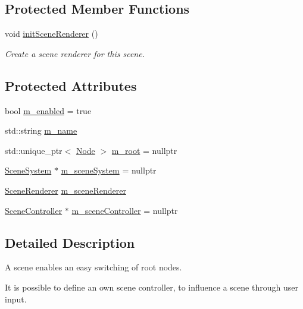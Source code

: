 \subsection*{Protected Member Functions}
\begin{DoxyCompactItemize}
\item 
void \mbox{\hyperlink{classec_1_1_scene_a137505b25a213810b1b477ad13daca7f}{init\+Scene\+Renderer}} ()
\begin{DoxyCompactList}\small\item\em Create a scene renderer for this scene. \end{DoxyCompactList}\end{DoxyCompactItemize}
\subsection*{Protected Attributes}
\begin{DoxyCompactItemize}
\item 
bool \mbox{\hyperlink{classec_1_1_scene_ad68ba7af20ecfbc45ee136842a38ccfe}{m\+\_\+enabled}} = true
\item 
std\+::string \mbox{\hyperlink{classec_1_1_scene_a58a25f1f2370535750e341085ddfd95b}{m\+\_\+name}}
\item 
std\+::unique\+\_\+ptr$<$ \mbox{\hyperlink{classec_1_1_node}{Node}} $>$ \mbox{\hyperlink{classec_1_1_scene_a7b7f1f4840087d56148e4c4be5737b50}{m\+\_\+root}} = nullptr
\item 
\mbox{\hyperlink{classec_1_1_scene_system}{Scene\+System}} $\ast$ \mbox{\hyperlink{classec_1_1_scene_ad63e472baf8e283c596891384ea98aad}{m\+\_\+scene\+System}} = nullptr
\item 
\mbox{\hyperlink{classec_1_1_scene_renderer}{Scene\+Renderer}} \mbox{\hyperlink{classec_1_1_scene_a17a2c241cec6bda0a5895b353aa28fa7}{m\+\_\+scene\+Renderer}}
\item 
\mbox{\hyperlink{classec_1_1_scene_controller}{Scene\+Controller}} $\ast$ \mbox{\hyperlink{classec_1_1_scene_aa6a8f71066fc44162b1c80341840d5fb}{m\+\_\+scene\+Controller}} = nullptr
\end{DoxyCompactItemize}


\subsection{Detailed Description}
A scene enables an easy switching of root nodes. 

It is possible to define an own scene controller, to influence a scene through user input. 

